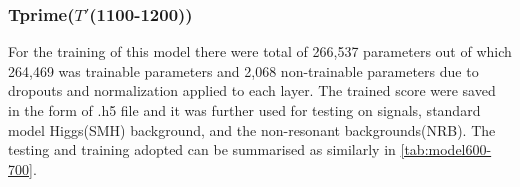 \subsubsection{Tprime($T'$(1100-1200))}
For the training of this model there were total of  266,537 parameters out of which 264,469 was trainable parameters and 2,068 non-trainable parameters due to dropouts and normalization applied to each layer. The trained score were saved in the form of .h5 file and it was further used for testing on signals, standard model Higgs(SMH) background, and the non-resonant backgrounds(NRB). The testing and training adopted can be summarised as similarly in \autoref{tab:model600-700}.




                        
